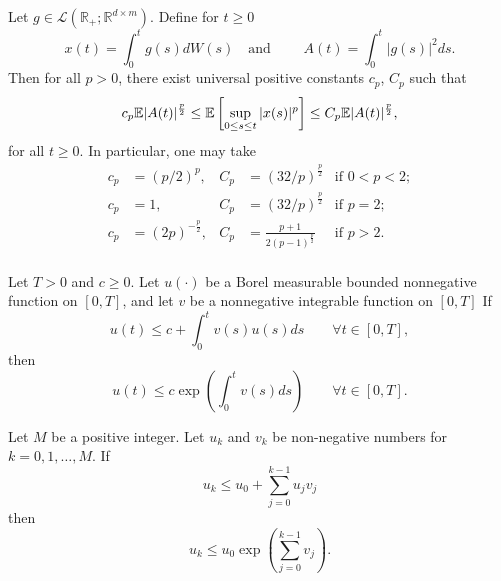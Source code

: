 \begin{bdg}
	Let $g\in \mathcal{L}(\mathbb{R}_+; \mathbb{R}^{d\times m})$. Define for $t\geq 0$
	\begin{equation}
		\label{thm:BDG}
		x(t) = \int_{0}^{t} g(s)dW(s) \quad \text{and } \qquad 
		A(t) = \int_{0}^{t} |g(s)|^2 ds.
	\end{equation}
	Then for all $p>0$, there exist universal positive constants $c_p$, $C_p$ such that
	\begin{equation}
		c_p\mathbb{E}|{A(t)}|^{\frac{p}{2}}
		\leq
		\mathbb{E}\left[
		\sup_{0\leq s \leq t} |x(s)|^p
		\right]
		\leq 
		C_p \mathbb{E}|A(t)|^{\frac{p}{2}},
	\end{equation}
	for all $t\geq 0$.  In particular, one may take
	\begin{align*}
	c_p &= (p/2)^p, & 			 C_p &= (32/p)^{\frac{p}{2}} & \text{if } 0<p<2; \\
	c_p &= 1,       & 			 C_p &= (32/p)^{\frac{p}{2}} & \text{if } p=2; \\
	c_p &= (2p)^{-\frac{p}{2}},& C_p &= \frac{p+1}{2(p-1)^{\frac{p}{2}}} & \text{if } p>2 .\\
	\end{align*}
\end{bdg}

\begin{Gronwall}
	Let $T > 0$ and $c \geq 0$. Let $u(\cdot)$ be a Borel measurable bounded nonnegative function on 
	$[0,T]$, and let $v$ be a nonnegative integrable function on $[0,T]$
	If
	$$
		u(t) \leq c 
		+\int_{0}^{t} v(s)u(s)ds \qquad \forall t \in [0,T],
	$$
	then
	\begin{equation}\label{thm:Gronwall}
		u(t) \leq c\exp
		\left(
		\int_{0}^{t} v(s)ds 
		\right)
		\qquad \forall t \in [0,T].
	\end{equation}
\end{Gronwall}
%
\begin{DiscreteGronwall}
	Let $M$ be a positive integer. Let $u_k$ and $v_k$ be non-negative numbers for $k=0,1,\dots,M$. 
	If
	$$
	u_k\leq u_0 + \sum_{j=0}^{k-1} u_j v_j
	$$
	then
	\begin{equation}
		\label{thm:DiscreteGronwall}
		u_k \leq u_0 
		\exp
		\left(
		\sum_{j=0}^{k-1}v_j
		\right).
	\end{equation}
\end{DiscreteGronwall}
